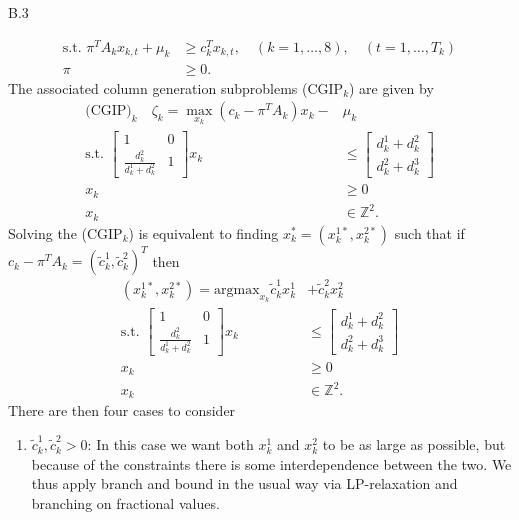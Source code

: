 \documentclass[a4paper]{article}
\begin{document}
\begin{exercise}{B.3}
\begin{enumerate}[label=(\roman*)]
\begin{align*}
          \text{s.t. } \pi^{T}A_kx_{k,t} + \mu_k &\geq c_k^{T}x_{k,t},\quad (k = 1,\ldots, 8),\quad (t = 1,\ldots, T_k) \\
          \pi &\geq 0
        .\end{align*}
        The associated column generation subproblems ($\text{CGIP} _k $) are given by
        \begin{align*}
          \text{(CGIP)}_k\quad \zeta_k = \max_{x_k} (c_k - \pi^{T}A_k)x_k - &\mu_k \\
          \text{s.t. } \begin{bmatrix}
            1 & 0 \\
            \frac{d_k^{2}}{d_k^{1} + d_k^2} & 1
            \end{bmatrix} x_k &\leq \begin{bmatrix}
            d_k^{1} + d_k^{2} \\
            d_k^2 + d_k^3
          \end{bmatrix} \\
          x_k &\geq 0 \\
          x_k &\in \mathbb{Z}^2
        .\end{align*}
        Solving the ($ \text{CGIP}_k $) is equivalent to finding $ x_k^{*} = (x_k^{1*}, x_k^{2*}) $ such that if $ c_k - \pi^{T}A_k = (\tilde{c}_k^{1}, \tilde{c}_k^{2})^{T} $ then
        \begin{align*}
          (x_k^{1*}, x_k^{2*}) = \text{argmax}_{x_k} \tilde{c}_k^{1}x_k^{1} &+ \tilde{c}_k^{2}x_k^2 \\
          \text{s.t. } \begin{bmatrix}
            1 & 0 \\
            \frac{d_k^{2}}{d_k^{1} + d_k^2} & 1
            \end{bmatrix} x_k &\leq \begin{bmatrix}
            d_k^{1} + d_k^{2} \\
            d_k^2 + d_k^3
          \end{bmatrix} \\
          x_k &\geq 0 \\
          x_k &\in \mathbb{Z}^2
        .\end{align*}
        There are then four cases to consider
        \begin{enumerate}[label=(\arabic*)]
          \item $ \tilde{c}_k^{1}, \tilde{c}_k^{2} > 0 $: In this case we want both $ x_k^{1} $ and $ x_k^{2} $ to be as large as possible, but because of the constraints there is some interdependence between the two. We thus apply branch and bound in the usual way via LP-relaxation and branching on fractional values.

\end{enumerate}
\end{enumerate}
\end{exercise}
\end{document}
